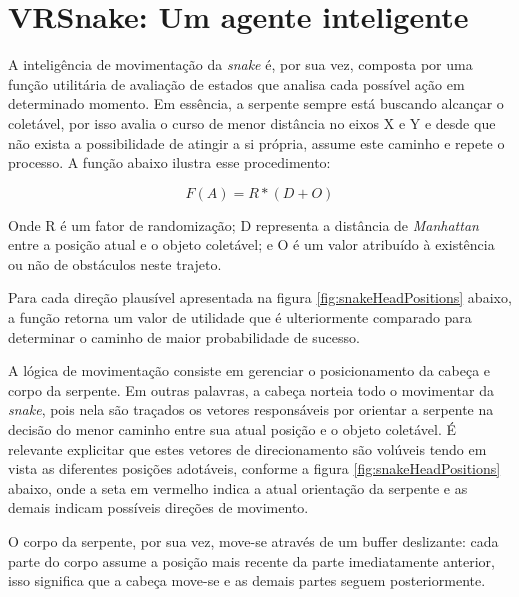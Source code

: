 \documentclass[conference]{IEEEtran}
\begin{document}
\section{VRSnake: Um agente inteligente}

A inteligência de movimentação da \textit{snake} é, por sua vez, composta por uma função utilitária de avaliação de estados que analisa cada possível ação em determinado momento. Em essência, a serpente sempre está buscando alcançar o coletável, por isso avalia o curso de menor distância no eixos X e Y e desde que não exista a possibilidade de atingir a si própria, assume este caminho e repete o processo. A função abaixo ilustra esse procedimento:

\begin{equation}
F(A) = R * (D + O)
\label{equation11}
\end{equation}

Onde R é um fator de randomização; D representa a distância de \textit{Manhattan} entre a posição atual e o objeto coletável; e O é um valor atribuído à existência ou não de obstáculos neste trajeto.

Para cada direção plausível apresentada na figura \ref{fig:snakeHeadPositions} abaixo, a função retorna um valor de utilidade que é ulteriormente comparado para determinar o caminho de maior probabilidade de sucesso.

A lógica de movimentação consiste em gerenciar o posicionamento da cabeça e corpo da serpente.  Em outras palavras, a cabeça norteia todo o movimentar da \textit{snake}, pois nela são traçados os vetores responsáveis por orientar a serpente na decisão do menor caminho entre sua atual posição e o objeto coletável. É relevante explicitar que estes vetores de direcionamento são volúveis tendo em vista as diferentes posições adotáveis, conforme a figura \ref{fig:snakeHeadPositions} abaixo, onde a seta em vermelho indica a atual orientação da serpente e as demais indicam possíveis direções de movimento.

O corpo da serpente, por sua vez, move-se através de um buffer deslizante: cada parte do corpo assume a posição mais recente da parte imediatamente anterior, isso significa que a cabeça move-se e as demais partes seguem posteriormente.
\end{document}
